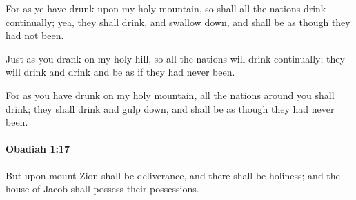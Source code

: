 			\begin{versebox}
					\item[BHS] 
					\item[LXX] 
					\item[ASV] For as ye have drunk upon my holy mountain, so shall all the nations drink continually; yea, they shall drink, and swallow down, and shall be as though they had not been.
					\item[NIV] Just as you drank on my holy hill, so all the nations will drink continually; they will drink and drink and be as if they had never been.
					\item[NRSV] For as you have drunk on my holy mountain, all the nations around you shall drink; they shall drink and gulp down, and shall be as though they had never been.
			\end{versebox}

		\paragraph{Obadiah 1:17} %
			\label{OBADIAH-1-17}

			But upon mount Zion shall be deliverance, and there shall be holiness; and the house of Jacob shall possess their possessions.

